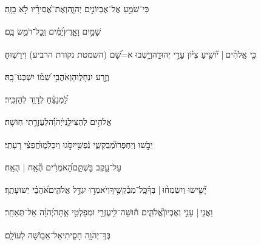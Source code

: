 \documentclass[12pt]{article}
\newcommand{\loc}[1]{\textsuperscript{\locf{#1}}}
\begin{document}
{\loc{ לד}~}‏כִּי־שֹׁמֵ֣עַ אֶל־אֶבְיוֹנִ֣ים יְהֹוָ֑ה{\hfill}וְאֶת־אֲ֝סִירָ֗יו לֹ֣א בָזָֽה׃\par

{\loc{ לה}~}‏ שָׁמַ֣יִם וָאָ֑רֶץ{\hfill}יַ֝מִּ֗ים וְֽכׇל־רֹמֵ֥שׂ בָּֽם׃\par

{\loc{ לו}~}‏כִּ֤י אֱלֹהִ֨ים |  י֘וֹשִׁ֤יעַ צִיּ֗וֹן{\hfill} עָרֵ֣י יְהוּדָ֑ה\newline\hspace*{.5em}וְיָ֥שְׁבוּ א=שָׁ֝ם (השמטת נקודת הרביע) וִירֵשֽׁוּהָ׃\par

{\loc{ לז}~}‏וְזֶ֣רַע  יִנְחָל֑וּהָ{\hfill}וְאֹהֲבֵ֥י שְׁ֝מ֗וֹ יִשְׁכְּנוּ־בָֽהּ׃\par\pend
\ledpb
\pstart[\subsection*{\textcolor{red}{פרק ע}}]\label{פרק ע}
{\loc{ א}~}‏לַ֝מְנַצֵּ֗חַ לְדָוִ֥ד לְהַזְכִּֽיר׃\par

{\loc{ ב}~}‏אֱלֹהִ֥ים לְהַצִּילֵ֑נִי{\hfill}יְ֝הֹוָ֗ה\hspace{1em}לְעֶזְרָ֥תִי חֽוּשָׁה׃\par

{\loc{ ג}~}‏יֵבֹ֣שׁוּ וְיַחְפְּרוּ֮{\hfill}מְבַקְשֵׁ֢י נַ֫פְשִׁ֥י\newline\hspace*{.5em}יִסֹּ֣גוּ  וְיִכָּלְמ֑וּ{\hfill}חֲ֝פֵצֵ֗י רָעָתִֽי׃\par

{\loc{ ד}~}‏ עַל־עֵ֣קֶב בׇּשְׁתָּ֑ם{\hfill}הָ֝אֹמְרִ֗ים הֶ֘אָ֥ח | הֶאָֽח׃\par

{\loc{ ה}~}‏יָ֘שִׂ֤ישׂוּ וְיִשְׂמְח֨וּ |  בְּךָ֗{\hfill}כׇּֽל־מְבַ֫קְשֶׁ֥יךָ\newline\hspace*{.5em}וְיֹאמְר֣וּ  יִגְדַּ֣ל אֱלֹהִ֑ים{\hfill}אֹ֝הֲבֵ֗י יְשׁוּעָתֶֽךָ׃\par

{\loc{ ו}~}‏וַאֲנִ֤י |  עָנִ֣י וְאֶבְיוֹן֮{\hfill}אֱלֹהִ֢ים ח֫וּשָׁה־לִּ֥י\newline\hspace*{.5em}עֶזְרִ֣י וּמְפַלְטִ֣י אַ֑תָּה{\hfill}יְ֝הֹוָ֗ה אַל־תְּאַחַֽר׃\par\pend
\ledpb
\pstart[\subsection*{\textcolor{red}{פרק עא}}]\label{פרק עא}
{\loc{ א}~}‏בְּךָֽ־יְהֹוָ֥ה חָסִ֑יתִי{\hfill}אַל־אֵב֥וֹשָׁה לְעוֹלָֽם׃\par
\end{document}
